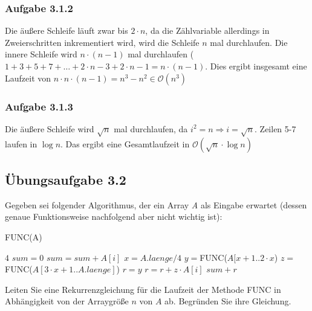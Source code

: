 \documentclass{article}
\begin{document}
\subsubsection{Aufgabe 3.1.2}
Die äußere Schleife läuft zwar bis $2\cdot n$, da die Zählvariable allerdings in Zweierschritten inkrementiert wird, wird die Schleife $n$ mal durchlaufen.
Die innere Schleife wird $n\cdot(n-1)$ mal durchlaufen ($1+3+5+7+\dots+2\cdot n-3+2\cdot n-1=n\cdot(n-1)$.
Dies ergibt insgesamt eine Laufzeit von $n \cdot n \cdot (n-1) = n^3-n^2 \in \mathcal{O}(n^3)$
\subsubsection{Aufgabe 3.1.3}
Die äußere Schleife wird $\sqrt{n}$ mal durchlaufen, da $i^2=n\Rightarrow i=\sqrt{n}$.
Zeilen 5-7 laufen in $\operatorname{log} n$.
Das ergibt eine Gesamtlaufzeit in $\mathcal{O}(\sqrt{n}\cdot\operatorname{log} n)$
\subsection{Übungsaufgabe 3.2}
\begin{flushright}
\begin{Large}
[~~~~\string| ~~2~]
\end{Large}
\end{flushright}
Gegeben sei folgender Algorithmus, der ein Array \textit{A} als Eingabe erwartet (dessen genaue Funktionsweise nachfolgend aber nicht wichtig ist):\\
\begin{algorithm}[H]
\caption{FUNC(A)}
\begin{algorithmic}[1]
	\RETURN $4$
\ELSE
	\STATE $sum = 0$
		\STATE $sum = sum + A[i]$
	\ENDFOR
	\STATE $x = A.laenge/4$
	\STATE $y = $FUNC($A[x+1..2\cdot x$)
	\STATE $z = $FUNC($A[3\cdot x+1..A.laenge]$)
	\STATE $r = y$
		\STATE $r = r + z \cdot A[i]$
	\ENDFOR
	\RETURN $sum+r$
\ENDIF
\end{algorithmic}
\end{algorithm}
Leiten Sie eine Rekurrenzgleichung für die Laufzeit der Methode \textsc{FUNC} in Abhängigkeit von der Arraygröße $n$ von $A$ ab.
Begründen Sie ihre Gleichung.
\vspace{1cm}\-\\
\end{document}

